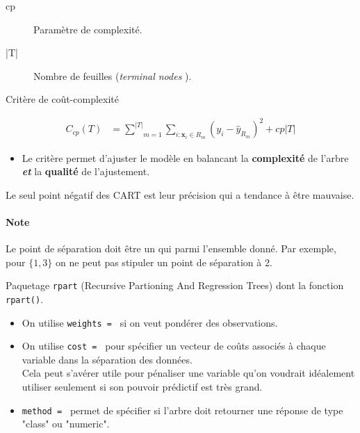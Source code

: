 \documentclass[10pt, french]{article}
\begin{document}
\begin{multicols*}{3}
\begin{definitionNOHFILL}
\begin{description}
	\item[cp]	Paramètre de complexité.
	\item[|T|]	Nombre de feuilles (\og \textit{terminal nodes} \fg{}).
	\item[Critère de coût-complexité]
\end{description}
\begin{align*}
	C_{cp}(T)	
	&=	\underset{m = 1}{\overset{| T |}{\sum}}\underset{i:\bm{x}_{i} \in R_{m}}{\sum} (y_{i} - \hat{y}_{R_{m}})^{2} + cp | T |
\end{align*}
\begin{itemize}[leftmargin = *]
	\item	Le critère permet d'ajuster le modèle en balancant la \textbf{complexité} de l'arbre \textbf{\textit{et}} la \textbf{qualité} de l'ajustement.
\end{itemize}
\end{definitionNOHFILL}

Le seul point négatif des CART est leur précision qui a tendance à être mauvaise.

\paragraph{Note}	Le point de séparation doit être un qui parmi l'ensemble donné. Par exemple, pour $\{1, 3\}$  on ne peut pas stipuler un point de séparation à 2.

\begin{definitionNOHFILLsub}
Paquetage \texttt{rpart} (Recursive Partioning And Regression Trees) dont la fonction \texttt{rpart()}.
\begin{itemize}
	\item	On utilise \texttt{weights = } si on veut pondérer des observations.
	\item	On utilise \texttt{cost = } pour spécifier un vecteur de coûts associés à chaque variable dans la séparation des données. \\
			Cela peut s'avérer utile pour pénaliser une variable qu'on voudrait idéalement utiliser seulement si son pouvoir prédictif est très grand.
	\item	\texttt{method = } permet de spécifier si l'arbre doit retourner une réponse de type "class" ou "numeric".
\end{itemize}


\end{definitionNOHFILLsub}
\end{multicols*}
\end{document}

